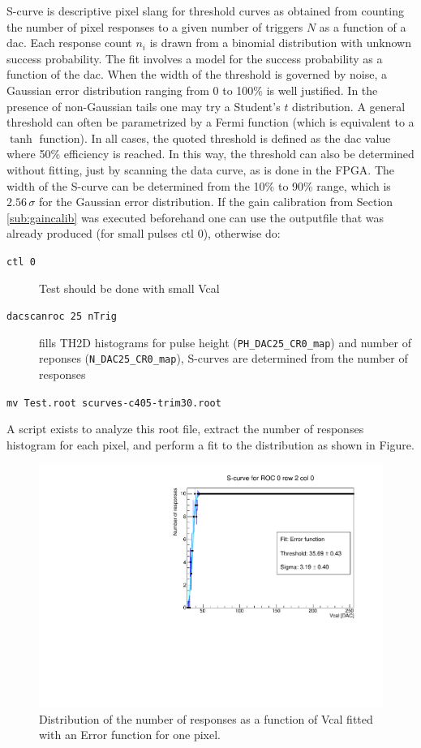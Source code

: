 \documentclass[english]{article}
\begin{document}
S-curve is descriptive pixel slang for threshold curves as obtained
from counting the number of pixel responses to a given number of triggers
$N$ as a function of a dac. Each response count $n_{i}$ is drawn
from a binomial distribution with unknown success probability. The
fit involves a model for the success probability as a function of
the dac. When the width of the threshold is governed by noise, a Gaussian
error distribution ranging from 0 to 100\% is well justified. In the
presence of non-Gaussian tails one may try a Student's $t$ distribution.
A general threshold can often be parametrized by a Fermi function
(which is equivalent to a $\tanh$ function). In all cases, the quoted
threshold is defined as the dac value where 50\% efficiency is reached.
In this way, the threshold can also be determined without fitting,
just by scanning the data curve, as is done in the FPGA. The width
of the S-curve can be determined from the 10\% to 90\% range, which
is $2.56\,\sigma$ for the Gaussian error distribution. If the gain
calibration from Section \ref{sub:gaincalib} was executed beforehand
one can use the outputfile that was already produced (for small pulses
ctl 0), otherwise do: 
\begin{description}
\item [\texttt{ctl\ 0}] Test should be done with small Vcal 
\item [\texttt{dacscanroc\ 25\ nTrig}] fills TH2D histograms for pulse height
(\texttt{PH\_DAC25\_CR0\_map}) and number of reponses
(\texttt{N\_DAC25\_CR0\_map}),
S-curves are determined from the number of responses 
\end{description}
\texttt{mv Test.root scurves-c405-trim30.root}

A script exists to analyze this root file, extract the number of responses
histogram for each pixel, and perform a fit to the distribution as
shown in Figure.

%
\begin{figure}
\noindent \begin{centering}
\includegraphics[scale=0.5]{c405-thrdist-scurve-trim36} 
\par\end{centering}

\protect\caption{Distribution of the number of responses as a function of Vcal fitted
with an Error function for one pixel.}
%
\end{figure}
\end{document}
